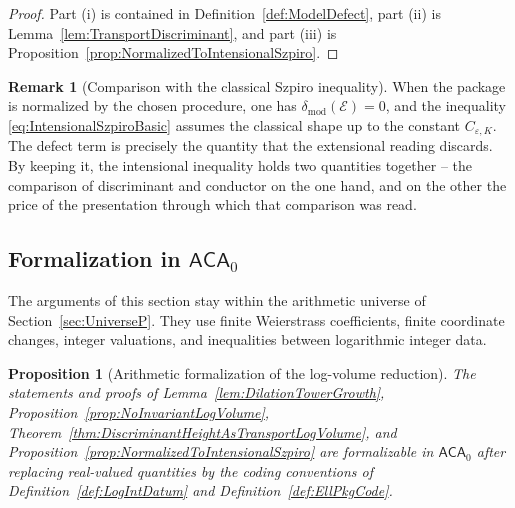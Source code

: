 \documentclass[10pt, reqno]{amsart}
\theoremstyle{plain}
\newtheorem{proposition}[theorem]{Proposition}
\theoremstyle{definition}
\newtheorem{remark}[theorem]{Remark}
\theoremstyle{plain}
\newcommand{\defect}{\delta_{\mathrm{mod}}}
\begin{document}
\begin{proof}
Part \textup{(i)} is contained in Definition~\ref{def:ModelDefect}, part \textup{(ii)} is Lemma~\ref{lem:TransportDiscriminant}, and part \textup{(iii)} is Proposition~\ref{prop:NormalizedToIntensionalSzpiro}.
\end{proof}

\begin{remark}[Comparison with the classical Szpiro inequality]\label{rem:SzpiroComparison}
When the package is normalized by the chosen procedure, one has $\defect(\mathcal{E}) = 0$, and the inequality \eqref{eq:IntensionalSzpiroBasic} assumes the classical shape up to the constant $C_{\varepsilon,K}$. The defect term is precisely the quantity that the extensional reading discards. By keeping it, the intensional inequality holds two quantities together -- the comparison of discriminant and conductor on the one hand, and on the other the price of the presentation through which that comparison was read.
\end{remark}

\subsection{Formalization in \texorpdfstring{\(\mathsf{ACA}_0\)}{ACA0}}\label{subsec:ACA0LogVolume}

The arguments of this section stay within the arithmetic universe of Section~\ref{sec:UniverseP}. They use finite Weierstrass coefficients, finite coordinate changes, integer valuations, and inequalities between logarithmic integer data.

\begin{proposition}[Arithmetic formalization of the log-volume reduction]
\label{prop:ACA0LogVolumeFormalization}
The statements and proofs of Lemma~\ref{lem:DilationTowerGrowth}, Proposition~\ref{prop:NoInvariantLogVolume}, Theorem~\ref{thm:DiscriminantHeightAsTransportLogVolume}, and Proposition~\ref{prop:NormalizedToIntensionalSzpiro} are formalizable in $\mathsf{ACA}_0$ after replacing real-valued quantities by the coding conventions of Definition~\ref{def:LogIntDatum} and Definition~\ref{def:EllPkgCode}.
\end{proposition}
\end{document}
